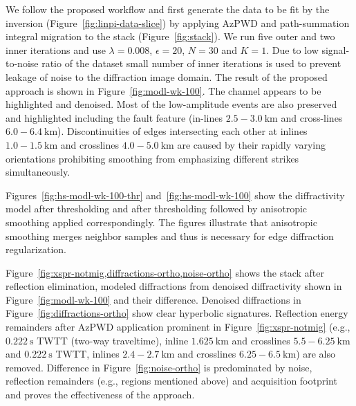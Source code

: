 

We follow the proposed workflow and first generate the data to be fit by the inversion (Figure~\ref{fig:linpi-data-slice}) by applying AzPWD and path-summation integral migration to the stack
(Figure~\ref{fig:stack}). We run five outer and two inner iterations and use $\lambda=0.008$, $\epsilon=20$, $N=30$ and $K=1$. Due to
low signal-to-noise ratio of the dataset small number of inner iterations is used to prevent leakage of noise to the diffraction image domain.
The result of the proposed approach is shown in Figure~\ref{fig:modl-wk-100}. The channel appears to be highlighted and denoised. Most of the
low-amplitude events are also preserved and highlighted including the fault feature (in-lines $2.5-3.0\ \text{km}$ and cross-lines $6.0-6.4\ \text{km}$).
Discontinuities of edges intersecting each other at inlines $1.0-1.5\ \text{km}$ and crosslines $4.0-5.0\ \text{km}$ are caused by their rapidly varying orientations prohibiting smoothing
from emphasizing different strikes simultaneously. 

Figures~\ref{fig:hs-modl-wk-100-thr} and~\ref{fig:hs-modl-wk-100} show
the diffractivity model after thresholding and after thresholding followed by anisotropic smoothing applied correspondingly. The figures
illustrate that anisotropic smoothing merges neighbor samples and thus is necessary for edge diffraction regularization.
 
Figure~\ref{fig:xspr-notmig,diffractions-ortho,noise-ortho} shows the stack after reflection elimination, modeled diffractions from denoised diffractivity
shown in Figure~\ref{fig:modl-wk-100} and their difference. Denoised diffractions in Figure~\ref{fig:diffractions-ortho} show clear hyperbolic signatures. Reflection
energy remainders after AzPWD application prominent in Figure~\ref{fig:xspr-notmig}
(e.g.,
$0.222\ \text{s}$ TWTT (two-way traveltime), inline $1.625\ \text{km}$ and crosslines $5.5-6.25\ \text{km}$ and
$0.222\ \text{s}$ TWTT, inlines $2.4-2.7\ \text{km}$ and crosslines $6.25-6.5\ \text{km}$)
are also removed.
Difference in Figure~\ref{fig:noise-ortho} is predominated by noise,
reflection remainders (e.g., regions mentioned above)
and acquisition footprint and proves the effectiveness of the approach.

